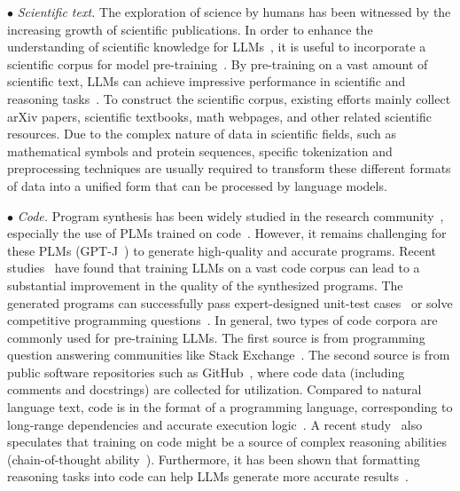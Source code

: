$\bullet$ \emph{Scientific text.}
The exploration of science by humans has been witnessed by the increasing growth  of scientific publications. 
In order to enhance the understanding of scientific knowledge for LLMs~\cite{Taylor-arxiv-2022-Galactica,Lewkowycz-arxiv-2022-Solving}, 
it is useful to incorporate a scientific corpus for model pre-training~\cite{Taylor-arxiv-2022-Galactica,Lewkowycz-arxiv-2022-Solving}. %
By pre-training on a vast amount of scientific text, LLMs can achieve impressive performance in scientific and reasoning tasks~\cite{Saier-arxiv-2023-unarXive}.
To construct the scientific corpus, existing efforts mainly collect arXiv papers, {scientific textbooks}, math webpages, and other related scientific resources.  
 Due to the complex nature of data in scientific fields, such as mathematical symbols and protein sequences, specific tokenization and preprocessing techniques are usually required to transform these different formats of data into a unified form that can be processed by language models.

$\bullet$ \emph{Code.} Program synthesis has been widely studied in the research community~\cite{Simon-JACM-1963-Experiments,Manna-CommunACM-1971-Toward,Feng-EMNLPFindings-2020-CodeBERT,Chen-arxiv-2021-evaluating,Austin-arxiv-2021-Program}, especially the use of PLMs trained on code~\cite{Black-GitHub-2021-GPT-Neo,Wang-GitHub-2021-GPT-J}.   
However, it remains challenging for these PLMs (\eg GPT-J~\cite{Wang-GitHub-2021-GPT-J}) to generate high-quality and accurate programs.
Recent studies~\cite{Chen-arxiv-2021-evaluating,Austin-arxiv-2021-Program} have found that training LLMs  on a vast code corpus can lead to a substantial improvement in the quality of the synthesized programs. The generated programs can successfully pass expert-designed unit-test cases~\cite{Chen-arxiv-2021-evaluating} or solve competitive programming questions~\cite{Li-Science-2022-AlphaCode}. %
{In general, two types of code corpora are commonly used for pre-training LLMs. The first source is  from programming question answering  communities like Stack Exchange~\cite{Xu-SIGPLAN-2022-Systematic}. The second source is  from public software repositories such as GitHub~\cite{Chen-arxiv-2021-evaluating,Austin-arxiv-2021-Program,nijkamp-arxiv-2022-Codegen}, where code data (including comments and docstrings)  are collected for utilization.}
Compared to natural language text, code is  in the format of a programming language, corresponding to long-range  dependencies and accurate execution logic~\cite{Madaan-emnlp-2022-Language}. 
{A recent study~\cite{FU-blog-2022-how}} also speculates that training on code might be a source of complex reasoning abilities (\eg chain-of-thought ability~\cite{Wei-arxiv-2022-chain}).  
{Furthermore, it has been shown that  formatting reasoning tasks into code can help  LLMs generate more accurate results~\cite{Madaan-emnlp-2022-Language}.}









